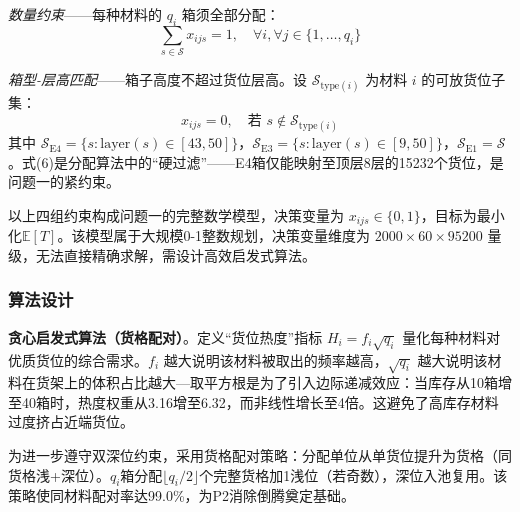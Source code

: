 \documentclass[a4paper]{cumcmthesis}
\newcommand{\E}[1]{\mathbb{E}\left[#1\right]}
\newcommand{\cS}{\mathcal{S}}
\begin{document}
\emph{数量约束}——每种材料的 $q_i$ 箱须全部分配：
\begin{equation}
\sum_{s\in\cS}x_{ijs}=1,\quad \forall i,\forall j\in\{1,\dots,q_i\}
\end{equation}

\emph{箱型-层高匹配}——箱子高度不超过货位层高。设 $\cS_{\text{type}(i)}$ 为材料 $i$ 的可放货位子集：
\begin{equation}
x_{ijs}=0,\quad\text{若 }s\notin\cS_{\text{type}(i)}
\end{equation}
其中 $\cS_{\text{E4}}=\{s:\text{layer}(s)\in[43,50]\}$，$\cS_{\text{E3}}=\{s:\text{layer}(s)\in[9,50]\}$，$\cS_{\text{E1}}=\cS$。式(6)是分配算法中的``硬过滤''——E4箱仅能映射至顶层8层的15232个货位，是问题一的紧约束。

以上四组约束构成问题一的完整数学模型，决策变量为 $x_{ijs}\in\{0,1\}$，目标为最小化$\E{T}$。该模型属于大规模0-1整数规划，决策变量维度为 $2000\times 60\times 95200$ 量级，无法直接精确求解，需设计高效启发式算法。

\FloatBarrier\subsubsection{算法设计}

\textbf{贪心启发式算法（货格配对）}。定义``货位热度''指标 $H_i=f_i\sqrt{q_i}$ 量化每种材料对优质货位的综合需求。$f_i$ 越大说明该材料被取出的频率越高，$\sqrt{q_i}$ 越大说明该材料在货架上的体积占比越大---取平方根是为了引入边际递减效应：当库存从10箱增至40箱时，热度权重从3.16增至6.32，而非线性增长至4倍。这避免了高库存材料过度挤占近端货位。

为进一步遵守双深位约束，采用货格配对策略：分配单位从单货位提升为货格（同货格浅+深位）。$q_i$箱分配$\lfloor q_i/2\rfloor$个完整货格加1浅位（若奇数），深位入池复用。该策略使同材料配对率达99.0\%，为P2消除倒腾奠定基础。
\end{document}
